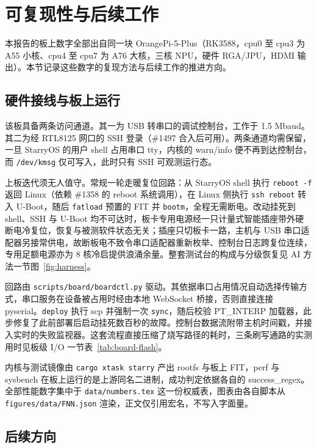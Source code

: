 \section{可复现性与后续工作}

本报告的板上数字全部出自同一块 OrangePi-5-Plus（RK3588，cpu0 至 cpu3 为 A55 小核、cpu4 至 cpu7 为 A76 大核，三核 NPU，硬件 RGA/JPU，HDMI 输出）。本节记录这些数字的复现方法与后续工作的推进方向。

\subsection{硬件接线与板上运行}

该板具备两条访问通道。其一为 USB 转串口的调试控制台，工作于 1.5 Mbaud。其二为经 RTL8125 网口的 SSH 登录（\#1497 合入后可用）。两条通道均需保留，一旦 StarryOS 的用户 shell 占用串口 tty，内核的 warn/info 便不再到达控制台，而 \texttt{/dev/kmsg} 仅可写入，此时只有 SSH 可观测运行态。

上板迭代须无人值守。常规一轮走暖复位回路：从 StarryOS shell 执行 \texttt{reboot -f} 返回 Linux（依赖 \#1358 的 reboot 系统调用），在 Linux 侧执行 \texttt{ssh reboot} 转入 U-Boot，随后 \texttt{fatload} 预置的 FIT 并 \texttt{bootm}，全程无需断电。改动挂死到 shell、SSH 与 U-Boot 均不可达时，板卡专用电源经一只计量式智能插座带外硬断电冷复位，恢复与被测软件状态无关；插座只切板卡一路，主机与 USB 串口适配器另接常供电，故断板电不致令串口适配器重新枚举、控制台日志跨复位连续，专用足额电源亦为 8 核冷启提供浪涌余量。整套测试台的构成与分级恢复见 AI 方法一节图~\ref{fig:harness}。

回路由 \texttt{scripts/board/boardctl.py} 驱动。其依据串口占用情况自动选择传输方式，串口服务在设备被占用时经由本地 WebSocket 桥接，否则直接连接 pyserial。\texttt{deploy} 执行 scp 并强制一次 \texttt{sync}，随后校验 PT\_INTERP 加载器，此步修复了此前部署后启动挂死数百秒的故障。控制台数据流附带主机时间戳，并接入实时的失败监视器。这套流程直接压缩了烧写路径的耗时，三条刷写通路的实测用时见板级 I/O 一节表~\ref{tab:board-flash}。

内核与测试镜像由 \texttt{cargo xtask starry} 产出 rootfs 与板上 FIT，perf 与 sysbench 在板上运行的是上游同名二进制，成功判定依据各自的 success\_regex。全部性能数字集中于 \texttt{data/numbers.tex} 这一份权威表，图表由各自脚本从 \texttt{figures/data/FNN.json} 渲染，正文仅引用宏名，不写入字面量。

\subsection{后续方向}

